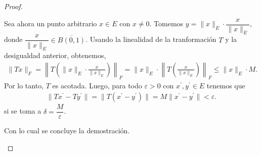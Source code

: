 \begin{proof}
\begin{itemize}
    Sea ahora un punto arbitrario $x \in E$ con $x \neq 0$. Tomemos $y = \|x\|_E \cdot \dfrac{x}{\|x\|_E}$, donde $ \dfrac{x}{\|x\|_E}\in \overline{B(0,1)}$. Usando la linealidad de la tranformación $T$ y la desigualdad anterior, obtenemos,
    \begin{align*}
      \|T x\|_F = \left\| T\left( \|x\|_E \cdot \frac{x}{\|x\|_E} \right) \right\|_F = \|x\|_E \cdot \left\| T\left( \frac{x}{\|x\|_E} \right) \right\|_F \leq \|x\|_E \cdot M 
    .\end{align*}
    Por lo tanto, $T$ es acotada. Luego, para todo $\varepsilon>0$ con $x^{\prime}, y^{\prime}\in E$ tenemos que 
    \begin{align*}
        \|Tx^{\prime}-Ty^{\prime}\|=\|T(x^{\prime}-y^{\prime})\|=M\|x^{\prime}-y^{\prime} \|<\varepsilon
    .\end{align*}
    si se toma a $\delta= \dfrac{M}{\varepsilon}$.


    Con lo cual se concluye la demostración.

\end{itemize}

   


\end{proof}